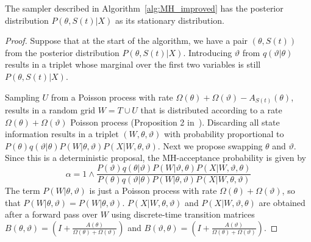 \begin{proposition}
  The sampler described in Algorithm~\ref{alg:MH_improved} has the posterior
  distribution $P(\theta,S(t)|X)$ as its stationary distribution.
\end{proposition}
\begin{proof}
  Suppose that at the start of the algorithm, we have a pair $(\theta,S(t))$ from
  the posterior distribution $P(\theta,S(t)|X)$. Introducing $\vartheta$
  from $q(\vartheta|\theta)$ results in a triplet whose marginal over the first
  two variables is still $P(\theta,S(t)|X)$.

  Sampling $U$ from a Poisson process with rate $\Omega(\theta) +
  \Omega(\vartheta) - A_{S(t)}(\theta)$, results in a random grid $W = T \cup U$
  that is distributed according to a rate $\Omega(\theta) + \Omega(\vartheta)$
  Poisson process (Proposition 2 in~\cite{RaoTeh13}). Discarding all state 
  information results in a triplet $(W,\theta,\vartheta)$ with probability
  proportional to $P(\theta)q(\vartheta|\theta)P(W|\theta,\vartheta)
  P(X|W,\theta,\vartheta)$.
Next we propose swapping $\theta$ and $\vartheta$. Since this
is a deterministic proposal, the MH-acceptance probability is given by
$$\alpha = 1 \wedge \frac{P(\vartheta)q(\theta|\vartheta)P(W|\vartheta,\theta)
P(X|W,\vartheta,\theta)}{P(\theta)q(\vartheta|\theta)P(W|\theta,\vartheta)
P(X|W,\theta,\vartheta)}$$
The term $P(W|\theta,\vartheta)$ is just a Poisson process with rate $\Omega(\theta)+
\Omega(\vartheta)$, so that $P(W|\theta,\vartheta) = P(W|\theta,\vartheta)$. 
$P(X|W,\theta,\vartheta)$ and $P(X|W,\vartheta,\theta)$ are obtained
after a forward pass over $W$ using discrete-time transition matrices
$B(\theta,\vartheta) = \left(I + \frac{A(\theta)}{\Omega(\theta)+\Omega(\vartheta)}\right)$ 
and $B(\vartheta,\theta) = \left(I + \frac{A(\vartheta)}{\Omega(\theta)+\Omega(\vartheta)}\right)$. 


\end{proof}
